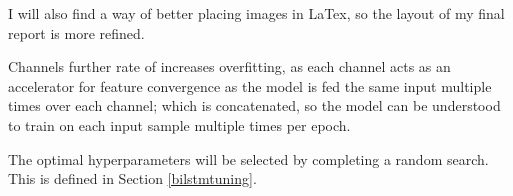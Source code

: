 I will also find a way of better placing images in LaTex, so the layout of my final report is more refined. 
\newpage


Channels further rate of increases overfitting, as each channel acts as an accelerator for feature convergence as the model is fed the same input multiple times over each channel; which is concatenated, so the model can be understood to train on each input sample multiple times per epoch. 


The optimal hyperparameters will be selected by completing a random search. This is defined in Section \ref{bilstmtuning}.